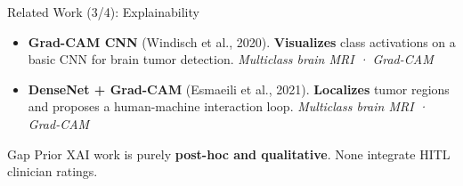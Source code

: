 \documentclass[aspectratio=169]{beamer}
\begin{document}
\begin{frame}{Related Work (3/4): Explainability}
  \begin{itemize}
    \item \textbf{Grad-CAM CNN} (Windisch et al., 2020). \textbf{Visualizes}
          class activations on a basic CNN for brain tumor detection.
          \emph{Multiclass brain MRI · Grad-CAM}
    \item \textbf{DenseNet + Grad-CAM} (Esmaeili et al., 2021). \textbf{Localizes}
          tumor regions and proposes a human-machine interaction loop.
          \emph{Multiclass brain MRI · Grad-CAM}
  \end{itemize}
  \vspace{0.3em}
  \begin{alertblock}{Gap}
    Prior XAI work is purely \textbf{post-hoc and qualitative}.
    None integrate HITL clinician ratings.
  \end{alertblock}
\end{frame}
\end{document}
